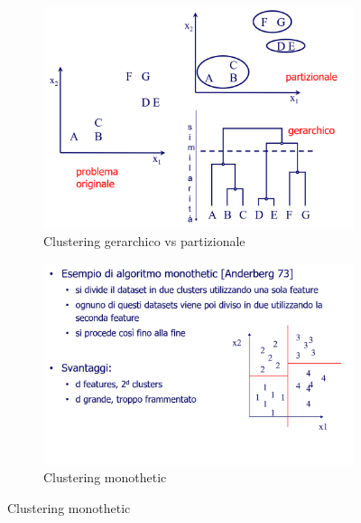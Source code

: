 \documentclass[a4paper,oneside,titlepage]{book}
\begin{document}
\begin{figure}[htp]
	\begin{subfigure}{0.49\textwidth}
	    \centering
		\includegraphics[width=\textwidth, height=\textheight, keepaspectratio]{clustering3.png}
		\caption{Clustering gerarchico vs partizionale}
	\end{subfigure}
	\hfill
	\begin{subfigure}{0.49\textwidth}
	    \centering
		\includegraphics[width=\textwidth, height=\textheight, keepaspectratio]{clustering4.png}
		\caption{Clustering monothetic}
	\end{subfigure}
\end{figure}
\end{document}
